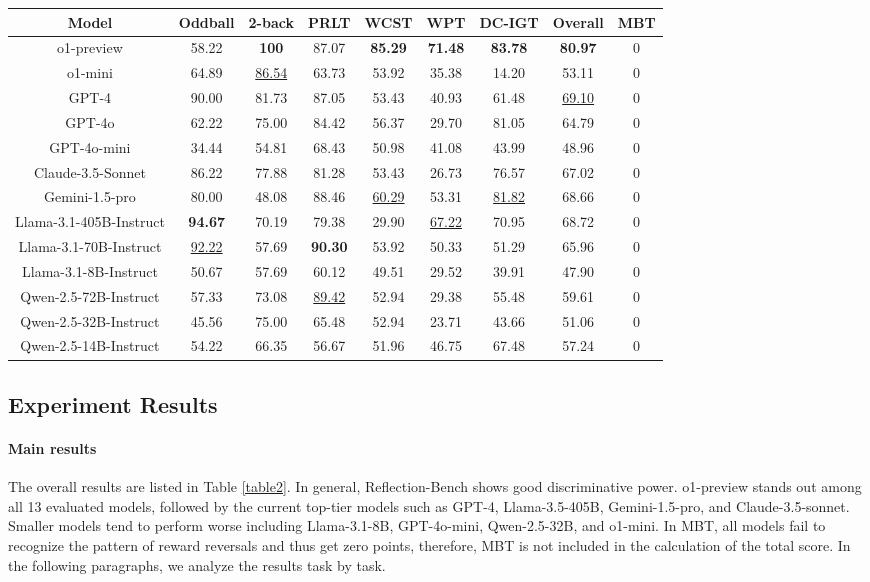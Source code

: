 \begin{table*}
  \centering
  \begin{tabular}{c|cccccccc}
    \hline
    \textbf{Model}& \textbf{Oddball}& \textbf{2-back} &\textbf{PRLT} & \textbf{WCST}& \textbf{WPT}& \textbf{DC-IGT}&\textbf{Overall} &\textbf{MBT}\\
    \hline
    o1-preview& 58.22&                            \textbf{100}& 87.07& \textbf{85.29}& \textbf{71.48}& \textbf{83.78}& \textbf{80.97}&0\\
    o1-mini& 64.89&                            \underline{86.54}& 63.73& 53.92& 35.38& 14.20& 53.11&0\\
    GPT-4& 90.00&                            81.73& 87.05& 53.43& 40.93& 61.48& \underline{69.10}&0\\
 GPT-4o& 62.22& 75.00& 84.42& 56.37& 29.70& 81.05& 64.79&0\\
    GPT-4o-mini& 34.44&                            54.81& 68.43& 50.98& 41.08& 43.99& 48.96&0\\
 Claude-3.5-Sonnet& 86.22& 77.88& 81.28& 53.43& 26.73& 76.57& 67.02&0\\
 Gemini-1.5-pro& 80.00& 48.08& 88.46& \underline{60.29}& 53.31& \underline{81.82}& 68.66&0\\
 Llama-3.1-405B-Instruct& \textbf{94.67}& 70.19& 79.38& 29.90& \underline{67.22}& 70.95& 68.72&0\\
  Llama-3.1-70B-Instruct& \underline{92.22}& 57.69& \textbf{90.30}& 53.92& 50.33& 51.29& 65.96&0\\
 Llama-3.1-8B-Instruct& 50.67& 57.69& 60.12& 49.51& 29.52& 39.91& 47.90&0\\
 Qwen-2.5-72B-Instruct& 57.33& 73.08& \underline{89.42}& 52.94& 29.38& 55.48& 59.61&0\\
 Qwen-2.5-32B-Instruct& 45.56& 75.00& 65.48& 52.94& 23.71& 43.66& 51.06&0\\
    Qwen-2.5-14B-Instruct&                         54.22& 66.35& 56.67& 51.96& 46.75& 67.48& 57.24&0\\
    \hline
  \end{tabular}
  \caption{Performances of 13 models on Reflection-Bench.}
  \label{table2}
\end{table*}

\subsection{Experiment Results}

\paragraph{Main results} The overall results are listed in Table \ref{table2}.  
In general, Reflection-Bench shows good discriminative power. o1-preview stands out among all 13 evaluated models, followed by the current top-tier models such as GPT-4, Llama-3.5-405B, Gemini-1.5-pro, and Claude-3.5-sonnet. Smaller models tend to perform worse including Llama-3.1-8B, GPT-4o-mini, Qwen-2.5-32B, and o1-mini. In MBT, all models fail to recognize the pattern of reward reversals and thus get zero points, therefore, MBT is not included in the calculation of the total score. In the following paragraphs, we analyze the results task by task.

